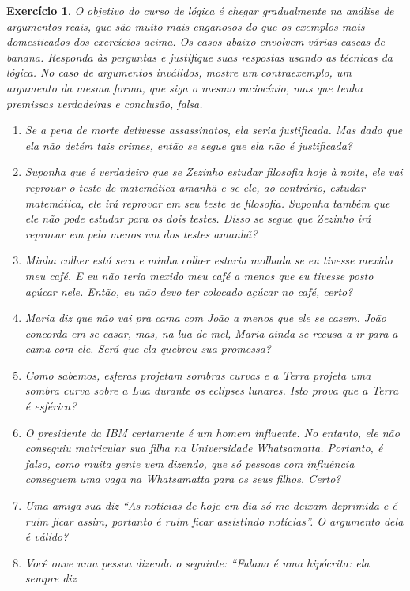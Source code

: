 \documentclass[a4paper,10pt]{article}
\newtheorem{exrcc}{Exercício}[subsection] %
\begin{document}
\begin{exrcc}
O objetivo do curso de lógica é chegar gradualmente na análise de argumentos reais, que
são muito mais enganosos do que os exemplos mais domesticados dos exercícios acima. Os
casos abaixo envolvem várias cascas de banana. Responda às perguntas e justifique suas
respostas usando as técnicas da lógica. No caso de argumentos inválidos, mostre um
contraexemplo, um argumento da mesma forma, que siga o mesmo raciocínio, mas que tenha
premissas verdadeiras e conclusão, falsa. 

\begin{enumerate}
\setlength{\itemsep}{0pt}
 \item Se a pena de morte detivesse assassinatos, ela seria justificada. Mas dado que
ela não detém tais crimes, então se segue que ela não é justificada?
\item Suponha que é verdadeiro que se Zezinho estudar filosofia hoje à noite, ele vai
reprovar o teste de matemática amanhã e se ele, ao contrário, estudar matemática, ele
irá reprovar em seu teste de filosofia. Suponha também que ele não pode estudar para os
dois testes. Disso se segue que Zezinho irá reprovar em pelo menos um dos testes amanhã?
\item Minha colher está seca e minha colher estaria molhada se eu tivesse mexido meu
café. E eu não teria mexido meu café a menos que eu tivesse posto açúcar nele. Então,
eu não devo ter colocado açúcar no café, certo?
\item Maria diz que não vai pra cama com João a menos que ele se casem. João concorda
em se casar, mas, na lua de mel, Maria ainda se recusa a ir para a cama com ele. Será
que ela quebrou sua promessa?
\item Como sabemos, esferas projetam sombras curvas e a Terra projeta uma sombra curva
sobre a Lua durante os eclipses lunares. Isto prova que a Terra é esférica?
\item O presidente da IBM certamente é um homem influente. No entanto, ele não
conseguiu matricular sua filha na Universidade Whatsamatta. Portanto, é falso, como
muita gente vem dizendo, que só pessoas com influência conseguem uma vaga na
Whatsamatta para os seus filhos. Certo?
\item Uma amiga sua diz ``As notícias de hoje em dia só me deixam deprimida e é ruim
ficar assim, portanto é ruim ficar assistindo notícias''. O argumento dela é válido?
\item Você ouve uma pessoa dizendo o seguinte: ``Fulana é uma hipócrita: ela sempre diz

\end{enumerate}
\end{exrcc}
\end{document}
